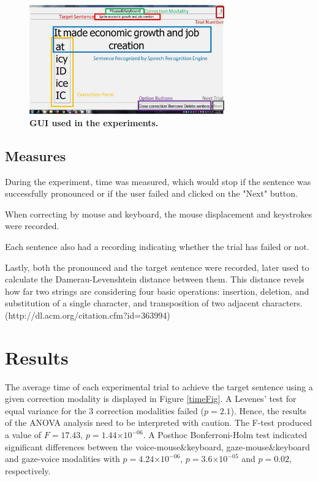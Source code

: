 \documentclass[]{article}
\providecommand{\e}[1]{\ensuremath{\times 10^{#1}}}
\begin{document}
\begin{figure}[ht]
\begin{center}
\includegraphics[width=0.75\textwidth]{figures/guiExampleEdited.jpg}
\end{center}
\caption{\textbf{GUI used in the experiments.}}
\label{guiExampleEdited}
\end{figure}

\subsection{Measures}
During the experiment, time was measured, which would stop if the sentence was successfully pronounced or if the user
failed and clicked on the "Next" button.

When correcting by mouse and keyboard, the mouse displacement and keystrokes were recorded.

Each sentence also had a recording indicating whether the trial has failed or not.

Lastly, both the pronounced and the target sentence were recorded, later used to calculate the Damerau-Levenshtein
distance between them. This distance revels how far two strings are considering four basic operations: insertion,
deletion, and substitution of a single character, and transposition of two adjacent characters.
(http://dl.acm.org/citation.cfm?id=363994)

\section{Results}
The average time of each experimental trial to achieve the target sentence using a given correction modality is
displayed in Figure \ref{timeFig}. A Levenes' test for equal variance for the 3 correction modalities failed ($p=2.1$).
Hence, the results of the ANOVA analysis need to be interpreted with caution. The F-test produced a value of $F=17.43$,
$p=1.44\e{-06}$. A Posthoc Bonferroni-Holm test indicated significant differences between the voice-mouse\&keyboard,
gaze-mouse\&keyboard and gaze-voice modalities with $p=4.24\e{-06}$, $p=3.6\e{-05}$ and $p=0.02$, respectively.
 
\end{document}
